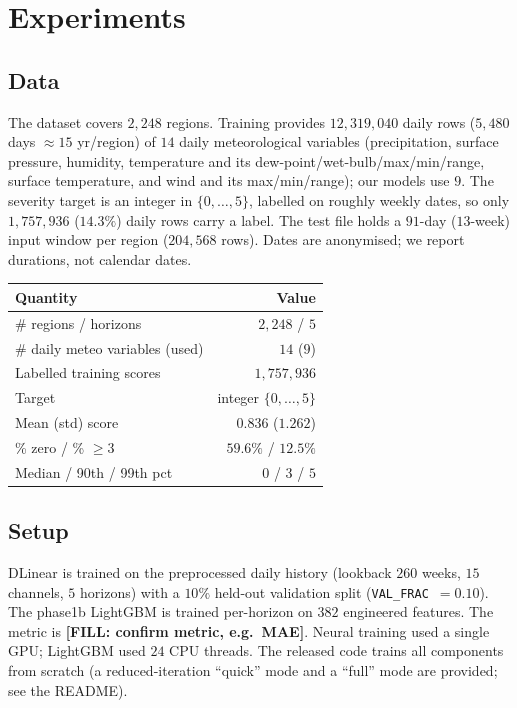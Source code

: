 \documentclass[11pt]{article}
\newcommand{\FILL}[1]{{\color{red}\textbf{[FILL: #1]}}}
\begin{document}
\section{Experiments}

\subsection{Data}
The dataset covers $2{,}248$ regions. Training provides $12{,}319{,}040$ daily rows
($5{,}480$ days $\approx 15$ yr/region) of $14$ daily meteorological variables (precipitation,
surface pressure, humidity, temperature and its dew-point/wet-bulb/max/min/range, surface
temperature, and wind and its max/min/range); our models use $9$. The severity target is an
integer in $\{0,\dots,5\}$, labelled on roughly weekly dates, so only $1{,}757{,}936$ ($14.3\%$)
daily rows carry a label. The test file holds a $91$-day ($13$-week) input window per region
($204{,}568$ rows). Dates are anonymised; we report durations, not calendar dates.
\begin{center}
\begin{tabular}{lr}
\toprule
Quantity & Value \\
\midrule
\# regions / horizons & $2{,}248$ / $5$ \\
\# daily meteo variables (used) & $14$ ($9$) \\
Labelled training scores & $1{,}757{,}936$ \\
Target & integer $\{0,\dots,5\}$ \\
Mean (std) score & $0.836$ ($1.262$) \\
\% zero / \% $\ge 3$ & $59.6\%$ / $12.5\%$ \\
Median / 90th / 99th pct & $0$ / $3$ / $5$ \\
\bottomrule
\end{tabular}
\end{center}

\subsection{Setup}
DLinear is trained on the preprocessed daily history (lookback $260$ weeks, $15$ channels,
$5$ horizons) with a $10\%$ held-out validation split (\texttt{VAL\_FRAC}~$=0.10$). The phase1b
LightGBM is trained per-horizon on $382$ engineered features. The metric is
\FILL{confirm metric, e.g.\ MAE}. Neural training used a single GPU; LightGBM used $24$ CPU
threads. The released code trains all components from scratch (a reduced-iteration ``quick'' mode
and a ``full'' mode are provided; see the README).
\end{document}
